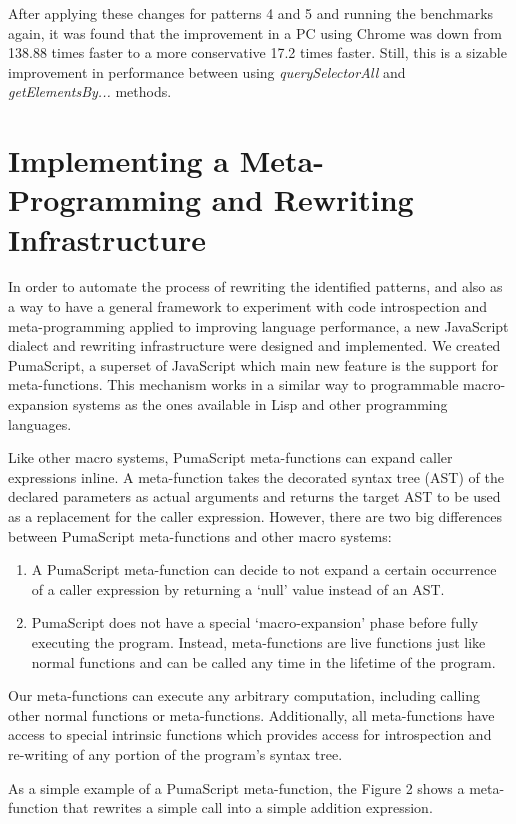 \documentclass[preprint,10pt]{sigplanconf}
\begin{document}
After applying these changes for patterns 4 and 5 and running the benchmarks again, it was found that the improvement in a PC using Chrome was down from 138.88 times faster to a more conservative 17.2 times faster. Still, this is a sizable improvement in performance between using \emph{querySelectorAll} and \emph{getElementsBy...} methods.

\section{Implementing a Meta-Programming and Rewriting Infrastructure}
In order to automate the process of rewriting the identified patterns, and also as a way to have a general framework to experiment with code introspection and meta-programming applied to improving language performance, a new JavaScript dialect and rewriting infrastructure were designed and implemented. We created PumaScript, a superset of JavaScript which main new feature is the support for meta-functions. This mechanism works in a similar way to programmable macro-expansion systems as the ones available in Lisp and other programming languages. 

Like other macro systems, PumaScript meta-functions can expand caller expressions inline. A meta-function takes the decorated syntax tree (AST) of the declared parameters as actual arguments and returns the target AST to be used as a replacement for the caller expression. However, there are two big differences between PumaScript meta-functions and other macro systems: 

\begin{enumerate}
  \item A PumaScript meta-function can decide to not expand a certain occurrence of a caller expression by returning a `null' value instead of an AST.
  \item PumaScript does not have a special `macro-expansion' phase before fully executing the program. Instead, meta-functions are live functions just like normal functions and can be called any time in the lifetime of the program.
\end{enumerate}
  
Our meta-functions can execute any arbitrary computation, including calling other normal functions or meta-functions. Additionally, all meta-functions have access to special intrinsic functions which provides access for introspection and re-writing of any portion of the program’s syntax tree. 

As a simple example of a PumaScript meta-function, the Figure 2 shows a meta-function that rewrites a simple call into a simple addition expression.
\end{document}
